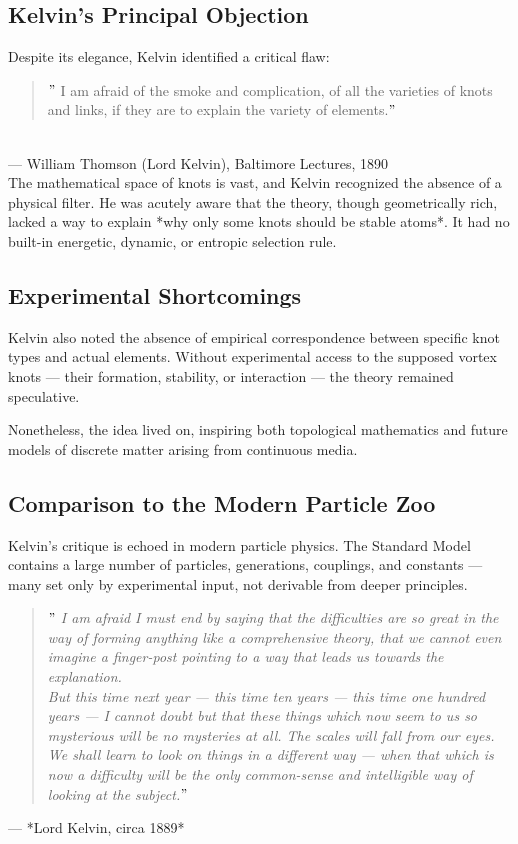 \documentclass[preprint]{revtex4-2}
\begin{document}
    \subsection*{Kelvin's Principal Objection}

    Despite its elegance, Kelvin identified a critical flaw:

    \begin{quote}
    \("\) I am afraid of the smoke and complication, of all the varieties of knots and links, if they are to explain the variety of elements.\("\)
    \end{quote}\\
     \hfill — William Thomson (Lord Kelvin), Baltimore Lectures, 1890\\
    The mathematical space of knots is vast, and Kelvin recognized the absence of a physical filter. He was acutely aware that the theory, though geometrically rich, lacked a way to explain *why only some knots should be stable atoms*. It had no built-in energetic, dynamic, or entropic selection rule.

    \subsection*{Experimental Shortcomings}

    Kelvin also noted the absence of empirical correspondence between specific knot types and actual elements. Without experimental access to the supposed vortex knots — their formation, stability, or interaction — the theory remained speculative.

    Nonetheless, the idea lived on, inspiring both topological mathematics and future models of discrete matter arising from continuous media.

    \subsection*{Comparison to the Modern Particle Zoo}

    Kelvin's critique is echoed in modern particle physics. The Standard Model contains a large number of particles, generations, couplings, and constants — many set only by experimental input, not derivable from deeper principles.

    \begin{quote}
    \textit{\("\) I am afraid I must end by saying that the difficulties are so great in the way of forming anything like a comprehensive theory, that we cannot even imagine a finger-post pointing to a way that leads us towards the explanation.} \\
    \textit{But this time next year — this time ten years — this time one hundred years — I cannot doubt but that these things which now seem to us so mysterious will be no mysteries at all. The scales will fall from our eyes. We shall learn to look on things in a different way — when that which is now a difficulty will be the only common-sense and intelligible way of looking at the subject.\("\)}
    \end{quote}
    \hfill — *Lord Kelvin, circa 1889*
\end{document}
